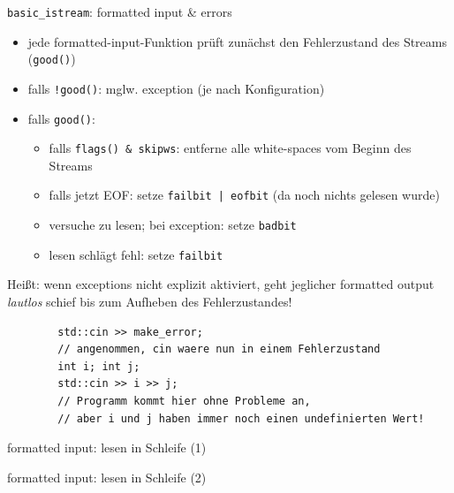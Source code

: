 \begin{frame}[fragile]{\texttt{basic\_istream}: formatted input \& errors}
	\begin{itemize}
		\item jede formatted-input-Funktion prüft zunächst den Fehlerzustand des Streams (\texttt{good()})
		\item falls \texttt{!good()}: mglw. exception (je nach Konfiguration)
		\item falls \texttt{good()}:
			\begin{itemize}
				\item falls \texttt{flags() \& skipws}: entferne alle white-spaces vom Beginn des Streams
				\item falls jetzt EOF: setze \texttt{failbit | eofbit} (da noch nichts gelesen wurde)
				\item versuche zu lesen; bei exception: setze \texttt{badbit}
				\item lesen schlägt fehl: setze \texttt{failbit}
			\end{itemize}
	\end{itemize}
	
	\pause
	
	Heißt: wenn exceptions nicht explizit aktiviert, geht jeglicher formatted output \emph{lautlos} schief bis zum Aufheben des Fehlerzustandes!
	
	\begin{lstlisting}
		std::cin >> make_error;
		// angenommen, cin waere nun in einem Fehlerzustand
		int i; int j;
		std::cin >> i >> j;
		// Programm kommt hier ohne Probleme an,
		// aber i und j haben immer noch einen undefinierten Wert!
	\end{lstlisting}
\end{frame}

\begin{frame}[t]{formatted input: lesen in Schleife (1)}
	\onslide*<+> {  }
	\onslide*<+> {  }
	\onslide*<+> {  }
	\onslide<+> {  }
\end{frame}

\begin{frame}[t]{formatted input: lesen in Schleife (2)}
	\onslide*<+> {  }
	\onslide*<+> {  }
	\onslide<+> {  }
\end{frame}

